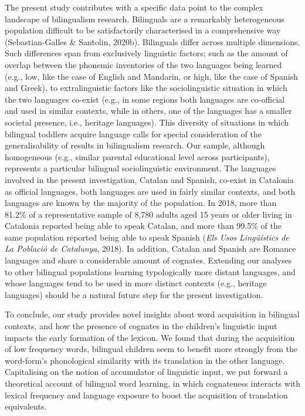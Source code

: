 \documentclass[
  12pt,
  b5paperpaper,
  twoside]{scrreprt}
\begin{document}
The present study contributes with a specific data point to the complex
landscape of bilingualism research. Bilinguals are a remarkably
heterogeneous population difficult to be satisfactorily characterised in
a comprehensive way (Sebastian-Galles \& Santolin, 2020b). Bilinguals
differ across multiple dimensions. Such differences span from
exclusively linguistic factors; such as the amount of overlap between
the phonemic inventories of the two languages being learned (e.g., low,
like the case of English and Mandarin, or high, like the case of Spanish
and Greek), to extralinguistic factors like the sociolinguistic
situation in which the two languages co-exist (e.g., in some regions
both languages are co-official and used in similar contexts, while in
others, one of the languages has a smaller societal presence, i.e.,
heritage languages). This diversity of situations in which bilingual
toddlers acquire language calls for special consideration of the
generalisability of results in bilingualism research. Our sample,
although homogeneous (e.g., similar parental educational level across
participants), represents a particular bilingual sociolinguistic
environment. The languages involved in the present investigation,
Catalan and Spanish, co-exist in Catalonia as official languages, both
languages are used in fairly similar contexts, and both languages are
known by the majority of the population. In 2018, more than 81.2\% of a
representative sample of 8,780 adults aged 15 years or older living in
Catalonia reported being able to speak Catalan, and more than 99.5\% of
the same population reported being able to speak Spanish (\emph{Els Usos
Lingüístics de La Població de Catalunya}, 2018). In addition, Catalan
and Spanish are Romance languages and share a considerable amount of
cognates. Extending our analyses to other bilingual populations learning
typologically more distant languages, and whose languages tend to be
used in more distinct contexts (e.g., heritage languages) should be a
natural future step for the present investigation.

To conclude, our study provides novel insights about word acquisition in
bilingual contexts, and how the presence of cognates in the children's
linguistic input impacts the early formation of the lexicon. We found
that during the acquisition of low frequency words, bilingual children
seem to benefit more strongly from the word-form's phonological
similarity with its translation in the other language. Capitalising on
the notion of accumulator of linguistic input, we put forward a
theoretical account of bilingual word learning, in which cognateness
interacts with lexical frequency and language exposure to boost the
acquisition of translation equivalents.
\end{document}
